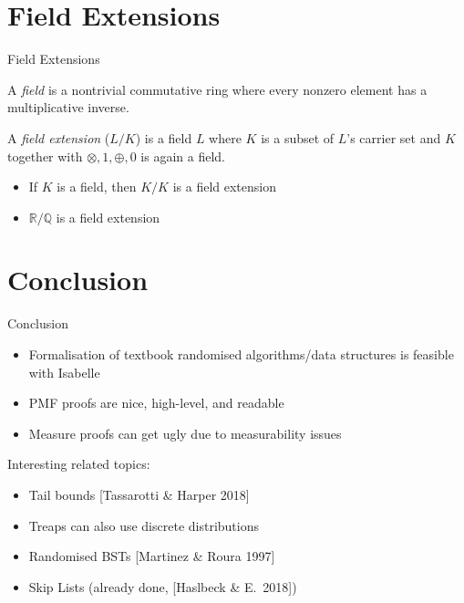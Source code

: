 \documentclass[%
	sans,
	12pt,
]{beamer}
\newcommand{\high}[1]{{\usebeamercolor[fg]{structure} #1}}
\begin{document}
\section{Field Extensions}
\begin{frame}
\begin{center}
\huge\high{Field Extensions}
\end{center}
\end{frame}

\begin{frame}
A \emph{field} is a nontrivial commutative ring where every nonzero element has a multiplicative inverse.

A \emph{field extension} ($L/K$) is a field $L$ where $K$ is a subset of $L$'s carrier set and $K$ together with $\otimes,1,\oplus,0$ is again a field.
\begin{itemize}
\item If $K$ is a field, then $K/K$ is a field extension\pause
\item $\mathbb{R}/\mathbb{Q}$ is a field extension
\end{itemize}
\end{frame}

\section{Conclusion}
\begin{frame}{Conclusion}
\begin{itemize}
\item Formalisation of textbook randomised algorithms/data structures is feasible with Isabelle\pause
\item PMF proofs are nice, high-level, and readable\pause
\item Measure proofs can get ugly due to measurability issues\pause
\end{itemize}
Interesting related topics:\pause
\begin{itemize}
\item Tail bounds [Tassarotti \& Harper 2018]\pause
\item Treaps can also use discrete distributions\pause
\item Randomised BSTs [Martinez \& Roura 1997]\pause
\item Skip Lists (already done, [Haslbeck \& E.\ 2018])
\end{itemize}
\end{frame}
\end{document}
